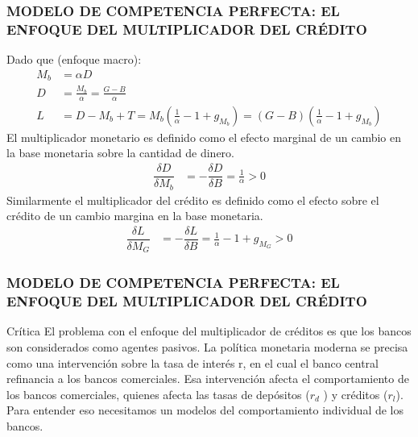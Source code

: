 \documentclass[10pt, xcolor=table, x11names]{beamer}
\begin{document}
\begin{frame}\frametitle{{\normalsize MODELO DE COMPETENCIA PERFECTA: EL ENFOQUE DEL MULTIPLICADOR DEL CRÉDITO} {}}
 Dado que (enfoque macro):
  \begin{align}
  M_{b}&=\alpha D   \\ \nonumber
  D&=\frac{M_{b}}{\alpha}=\frac{G-B}{\alpha}  \\ \nonumber
  L&=D-M_{b}+T=M_{b}\left(\frac{1}{\alpha}-1+g_{M_{b}} \right)=\left(G-B \right)\left( \frac{1}{\alpha}-1+g_{M_{b}} \right)  
  \end{align}   
  El multiplicador monetario es definido como el efecto marginal de un cambio en la base monetaria sobre la cantidad de dinero.  
  \begin{align}
  \dfrac{\delta D}{\delta M_{b}}&=-\dfrac{\delta D}{\delta B}=\frac{1}{\alpha}>0 \nonumber
  \end{align}    
  Similarmente el multiplicador del crédito es definido como el efecto sobre el crédito de un cambio margina en la base monetaria.
  \begin{align}
  \dfrac{\delta L}{\delta M_{G}}&=-\dfrac{\delta L}{\delta B}=\frac{1}{\alpha}-1+g_{M_{G}} >0 \nonumber
  \end{align}   
  
\end{frame}




\begin{frame}\frametitle{{\normalsize MODELO DE COMPETENCIA PERFECTA: EL ENFOQUE DEL MULTIPLICADOR DEL CRÉDITO} {}}
   
   \begin{block} {Crítica}
    El problema con el enfoque del multiplicador de créditos es que los bancos son considerados como agentes pasivos. La política monetaria moderna se precisa como una intervención sobre la tasa de interés r, en el cual el banco central refinancia a los bancos comerciales. Esa intervención afecta el comportamiento de los bancos comerciales, quienes afecta las tasas de depósitos ($r_{d}$ ) y créditos ($r_{l}$). Para entender eso necesitamos un modelos del comportamiento individual de los bancos.      
       
   \end{block}	 
    
   
    
\end{frame}
\end{document}
